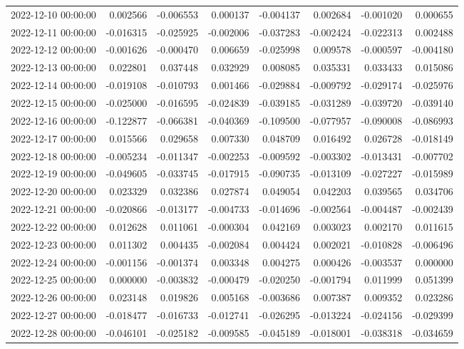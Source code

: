 \begin{tabular}{lrrrrrrr}
2022-12-10 00:00:00 & 0.002566 & -0.006553 & 0.000137 & -0.004137 & 0.002684 & -0.001020 & 0.000655 \\
2022-12-11 00:00:00 & -0.016315 & -0.025925 & -0.002006 & -0.037283 & -0.002424 & -0.022313 & 0.002488 \\
2022-12-12 00:00:00 & -0.001626 & -0.000470 & 0.006659 & -0.025998 & 0.009578 & -0.000597 & -0.004180 \\
2022-12-13 00:00:00 & 0.022801 & 0.037448 & 0.032929 & 0.008085 & 0.035331 & 0.033433 & 0.015086 \\
2022-12-14 00:00:00 & -0.019108 & -0.010793 & 0.001466 & -0.029884 & -0.009792 & -0.029174 & -0.025976 \\
2022-12-15 00:00:00 & -0.025000 & -0.016595 & -0.024839 & -0.039185 & -0.031289 & -0.039720 & -0.039140 \\
2022-12-16 00:00:00 & -0.122877 & -0.066381 & -0.040369 & -0.109500 & -0.077957 & -0.090008 & -0.086993 \\
2022-12-17 00:00:00 & 0.015566 & 0.029658 & 0.007330 & 0.048709 & 0.016492 & 0.026728 & -0.018149 \\
2022-12-18 00:00:00 & -0.005234 & -0.011347 & -0.002253 & -0.009592 & -0.003302 & -0.013431 & -0.007702 \\
2022-12-19 00:00:00 & -0.049605 & -0.033745 & -0.017915 & -0.090735 & -0.013109 & -0.027227 & -0.015989 \\
2022-12-20 00:00:00 & 0.023329 & 0.032386 & 0.027874 & 0.049054 & 0.042203 & 0.039565 & 0.034706 \\
2022-12-21 00:00:00 & -0.020866 & -0.013177 & -0.004733 & -0.014696 & -0.002564 & -0.004487 & -0.002439 \\
2022-12-22 00:00:00 & 0.012628 & 0.011061 & -0.000304 & 0.042169 & 0.003023 & 0.002170 & 0.011615 \\
2022-12-23 00:00:00 & 0.011302 & 0.004435 & -0.002084 & 0.004424 & 0.002021 & -0.010828 & -0.006496 \\
2022-12-24 00:00:00 & -0.001156 & -0.001374 & 0.003348 & 0.004275 & 0.000426 & -0.003537 & 0.000000 \\
2022-12-25 00:00:00 & 0.000000 & -0.003832 & -0.000479 & -0.020250 & -0.001794 & 0.011999 & 0.051399 \\
2022-12-26 00:00:00 & 0.023148 & 0.019826 & 0.005168 & -0.003686 & 0.007387 & 0.009352 & 0.023286 \\
2022-12-27 00:00:00 & -0.018477 & -0.016733 & -0.012741 & -0.026295 & -0.013224 & -0.024156 & -0.029399 \\
2022-12-28 00:00:00 & -0.046101 & -0.025182 & -0.009585 & -0.045189 & -0.018001 & -0.038318 & -0.034659 \\

\end{tabular}
